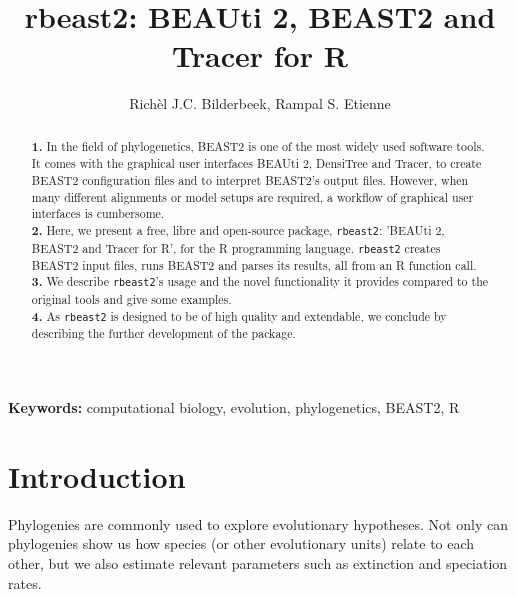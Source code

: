 \documentclass{article}
\title{rbeast2: BEAUti 2, BEAST2 and Tracer for R}
\author{Rich\`el J.C. Bilderbeek, Rampal S. Etienne}
\begin{document}
\maketitle

\begin{abstract}

  \textbf{1. }
    In the field of phylogenetics, 
    BEAST2 is one of the most widely used software tools. 
    It comes with the graphical user interfaces BEAUti 2, DensiTree and Tracer,
    to create BEAST2 configuration files and to interpret BEAST2's output files. 
    However, when many different alignments or model 
    setups are required, a workflow of graphical user interfaces is cumbersome. \\
  \textbf{2. }
    Here, we present a free, libre and open-source package, \verb;rbeast2;: 
    'BEAUti 2, BEAST2 and Tracer for R', for the R programming language. 
    \verb;rbeast2; creates BEAST2 input files, runs BEAST2 and parses its results, 
    all from an R function call. \\
  \textbf{3. }
    We describe \verb;rbeast2;'s usage and the novel functionality it provides
    compared to the original tools and give some examples. \\
  \textbf{4. }
    As \verb;rbeast2; is designed to be of high quality and extendable, 
    we conclude by describing the further development of the package. \\
\end{abstract}


{\bf Keywords:} computational biology, evolution, phylogenetics, BEAST2, R


\section{Introduction}

Phylogenies are commonly used to explore evolutionary hypotheses.
Not only can phylogenies show us how species (or other
evolutionary units) relate to each other, 
but we also estimate relevant parameters such as extinction and 
speciation rates.
\end{document}

